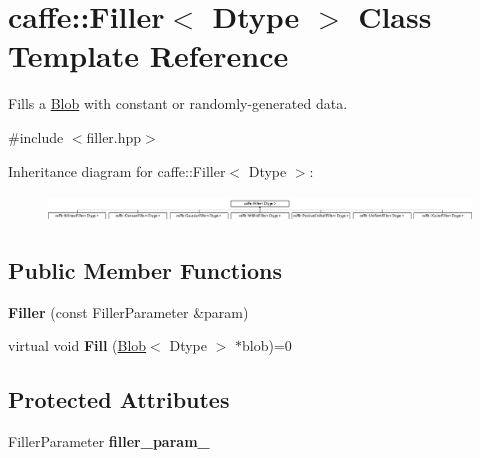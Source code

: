 \hypertarget{classcaffe_1_1Filler}{}\section{caffe\+:\+:Filler$<$ Dtype $>$ Class Template Reference}
\label{classcaffe_1_1Filler}


Fills a \hyperlink{classcaffe_1_1Blob}{Blob} with constant or randomly-\/generated data.  




{\ttfamily \#include $<$filler.\+hpp$>$}

Inheritance diagram for caffe\+:\+:Filler$<$ Dtype $>$\+:\begin{figure}[H]
\begin{center}
\leavevmode
\includegraphics[height=0.707965cm]{classcaffe_1_1Filler}
\end{center}
\end{figure}
\subsection*{Public Member Functions}
\begin{DoxyCompactItemize}
\item 
{\bfseries Filler} (const Filler\+Parameter \&param)\hypertarget{classcaffe_1_1Filler_aff156b1d4e5dbbbad720aa776df44512}{}\label{classcaffe_1_1Filler_aff156b1d4e5dbbbad720aa776df44512}

\item 
virtual void {\bfseries Fill} (\hyperlink{classcaffe_1_1Blob}{Blob}$<$ Dtype $>$ $\ast$blob)=0\hypertarget{classcaffe_1_1Filler_acd02177b669381252a7c484f51432d30}{}\label{classcaffe_1_1Filler_acd02177b669381252a7c484f51432d30}

\end{DoxyCompactItemize}
\subsection*{Protected Attributes}
\begin{DoxyCompactItemize}
\item 
Filler\+Parameter {\bfseries filler\+\_\+param\+\_\+}\hypertarget{classcaffe_1_1Filler_a1ded14cf43eeb7b45628770842c4348c}{}\label{classcaffe_1_1Filler_a1ded14cf43eeb7b45628770842c4348c}

\end{DoxyCompactItemize}


